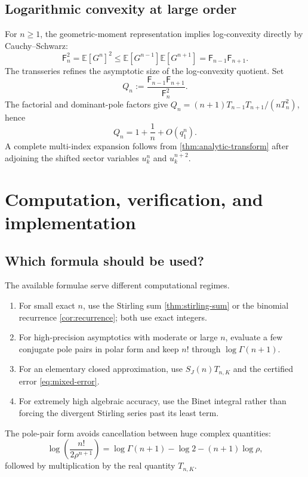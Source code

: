 \documentclass[11pt,a4paper,oneside]{article}
\theoremstyle{definition}
\theoremstyle{remark}
\newcommand{\Fub}{\mathsf{F}}
\begin{document}
\subsection{Logarithmic convexity at large order}
For $n\ge1$, the geometric-moment representation implies log-convexity
directly by Cauchy--Schwarz:
\[
 \Fub_n^2=\mathbb E[G^n]^2
 \le\mathbb E[G^{n-1}]\mathbb E[G^{n+1}]
 =\Fub_{n-1}\Fub_{n+1}.
\]
The transseries refines the asymptotic size of the log-convexity quotient.  Set
\[
 Q_n:=\frac{\Fub_{n-1}\Fub_{n+1}}{\Fub_n^2}.
\]
The factorial and dominant-pole factors give
\(
 Q_n=(n+1)T_{n-1}T_{n+1}/(nT_n^2)
\), hence
\begin{equation}\label{eq:logconvex-ratio}
 Q_n=1+\frac1n+O(q_1^{n}).
\end{equation}
A complete multi-index expansion follows from
\cref{thm:analytic-transform} after adjoining the shifted sector variables
$u_k^{n}$ and $u_k^{n+2}$.

\section{Computation, verification, and implementation}\label{sec:computation}

\subsection{Which formula should be used?}
The available formulae serve different computational regimes.
\begin{enumerate}
 \item For small exact $n$, use the Stirling sum
       \cref{thm:stirling-sum} or the binomial recurrence
       \cref{cor:recurrence}; both use exact integers.
 \item For high-precision asymptotics with moderate or large $n$, evaluate a
       few conjugate pole pairs in polar form and keep $n!$ through
       $\log\Gamma(n+1)$.
 \item For an elementary closed approximation, use $S_J(n)T_{n,K}$ and the
       certified error \cref{eq:mixed-error}.
 \item For extremely high algebraic accuracy, use the Binet integral rather
       than forcing the divergent Stirling series past its least term.
\end{enumerate}

The pole-pair form avoids cancellation between huge complex quantities:
\[
 \log\!\left(\frac{n!}{2\rho^{n+1}}\right)
 =\log\Gamma(n+1)-\log2-(n+1)\log\rho,
\]
followed by multiplication by the real quantity $T_{n,K}$.
\end{document}
